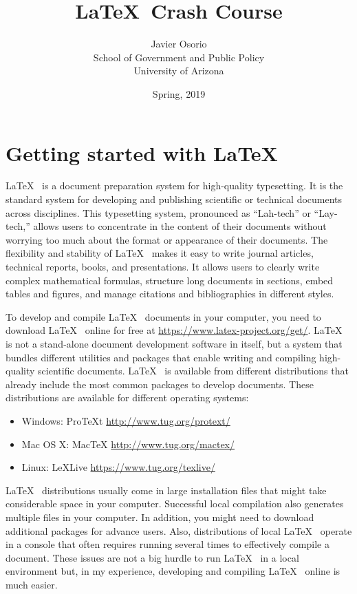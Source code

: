 \documentclass[12pt,letterpaper]{article}
\title{\LaTeX~Crash Course}
\author{Javier Osorio \\ School of Government and Public Policy \\ University of Arizona }
\date{Spring, 2019}
\begin{document}
\maketitle

\newpage
\tableofcontents{}
\newpage

\section{Getting started with \LaTeX}

\LaTeX~ is a document preparation system for high-quality typesetting. It is the standard system for developing and publishing scientific or technical documents across disciplines. This typesetting system, pronounced as ``Lah-tech'' or ``Lay-tech,''  allows users to concentrate in the content of their documents without worrying too much about the format or appearance of their documents. The flexibility and stability of \LaTeX~ makes it easy to write journal articles, technical reports, books, and presentations. It allows users to clearly write complex mathematical formulas, structure long documents in sections, embed tables and figures, and manage citations and bibliographies in different styles.

To develop and compile \LaTeX~ documents in your computer, you need to download \LaTeX~ online for free at \url{https://www.latex-project.org/get/}. \LaTeX~ is not a stand-alone document development software in itself, but a system that bundles different utilities and packages that enable writing and compiling high-quality scientific documents. \LaTeX~ is available from different distributions that already include the most common packages to develop documents. These distributions are available for different operating systems:

\begin{itemize}
\item Windows: ProTeXt \url{http://www.tug.org/protext/} 
\item Mac OS X: MacTeX \url{http://www.tug.org/mactex/}
\item Linux: LeXLive \url{https://www.tug.org/texlive/}
\end{itemize}

\LaTeX~ distributions usually come in large installation files that might take considerable space in your computer. Successful local compilation also generates multiple files in your computer. In addition, you might need to download additional packages for advance users. Also, distributions of local \LaTeX~ operate in a console that often requires running several times to effectively compile a document. These issues are not a big hurdle to run \LaTeX~ in a local environment but, in my experience, developing and compiling \LaTeX~ online is much easier.
\end{document}

